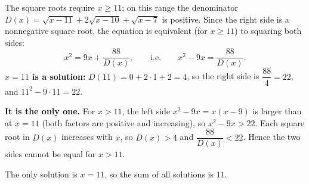 The square roots require $x\ge11$; on this range the denominator $D(x)=\sqrt{x-11}+2\sqrt{x-10}+\sqrt{x-7}$ is positive. Since the right side is a nonnegative square root, the equation is equivalent (for $x\ge11$) to squaring both sides:
\[x^2=9x+\dfrac{88}{D(x)},\qquad\text{i.e.}\qquad x^2-9x=\dfrac{88}{D(x)}.\]
\textbf{$x=11$ is a solution:} $D(11)=0+2\cdot1+2=4$, so the right side is $\dfrac{88}{4}=22$, and $11^2-9\cdot11=22$.

\textbf{It is the only one.} For $x>11$, the left side $x^2-9x=x(x-9)$ is larger than at $x=11$ (both factors are positive and increasing), so $x^2-9x>22$. Each square root in $D(x)$ increases with $x$, so $D(x)>4$ and $\dfrac{88}{D(x)}<22$. Hence the two sides cannot be equal for $x>11$.

The only solution is $x=11$, so the sum of all solutions is $\boxed{11}$.
